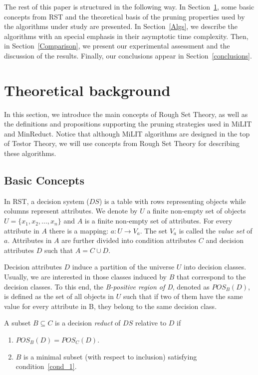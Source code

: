 \documentclass[citenumber]{llncs}
\begin{document}
	The rest of this paper is structured in the following way. In Section~\ref{tb}, some basic concepts from RST and the theoretical basis of the pruning properties used by the algorithms under study are presented. In Section~\ref{Algs}, we describe the algorithms with an special emphasis in their asymptotic time complexity. Then, in Section~\ref{Comparison}, we present our experimental assessment and the discussion of the results. Finally, our conclusions appear in Section~\ref{conclusions}.
						
%
\section{Theoretical background} \label{tb}
%

	In this section, we introduce the main concepts of Rough Set Theory, as well as the definitions and propositions supporting the pruning strategies used in MiLIT and MinReduct. Notice that although MiLIT algorithms are designed in the top of Testor Theory, we will use concepts from Rough Set Theory for describing these algorithms.

%
\subsection{Basic Concepts} \label{basic_concetps}
%
	In RST, a decision system ($DS$) is a table with rows representing objects while columns represent attributes. We denote by $U$ a finite non-empty set of objects $U=\lbrace x_1,x_2,...,x_n\rbrace$ and $A$ is a finite non-empty set of attributes. For every attribute in $A$ there is a mapping: $a: U \rightarrow V_a$. The set $V_a$ is called the \textit{value set} of $a$. Attributes in $A$ are further divided into condition attributes $C$ and decision attributes $D$ such that $A=C \cup D$. 

	Decision attributes $D$ induce a partition of the universe $U$ into decision classes. Usually, we are interested in those classes induced by $B$ that correspond to the decision classes. To this end, the \textit{B-positive region of D}, denoted as $POS_B(D)$, is defined as the set of all objects in $U$ such that if two of them have the same value for every attribute in B, they belong to the same decision class.

	A subset $B \subseteq C$ is a decision \textit{reduct} of $DS$ relative to $D$ if
	\begin{enumerate}
		\item $POS_B(D)=POS_C(D)$. \label{cond_1}
		\item $B$ is a minimal subset (with respect to inclusion) satisfying condition~\ref{cond_1}.\label{cond_2}
	\end{enumerate}
\end{document}
